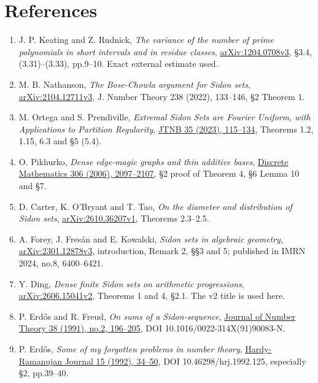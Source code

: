 \documentclass[11pt,a4paper]{article}
\providecommand{\tightlist}{\setlength{\itemsep}{0pt}\setlength{\parskip}{0pt}}
\begin{document}
\sloppy\section{References}\label{references}

\begin{enumerate}
\def\labelenumi{\arabic{enumi}.}
\tightlist
\item
  J. P. Keating and Z. Rudnick, \emph{The variance of the number of prime polynomials in short intervals and in residue classes}, \href{https://arxiv.org/pdf/1204.0708v3}{arXiv:1204.0708v3}, §3.4, (3.31)--(3.33), pp.9--10. Exact external estimate used.
\item
  M. B. Nathanson, \emph{The Bose-Chowla argument for Sidon sets}, \href{https://arxiv.org/pdf/2104.12711v3}{arXiv:2104.12711v3}, J. Number Theory 238 (2022), 133--146, §2 Theorem 1.
\item
  M. Ortega and S. Prendiville, \emph{Extremal Sidon Sets are Fourier Uniform, with Applications to Partition Regularity}, \href{https://www.numdam.org/item/10.5802/jtnb.1239.pdf}{JTNB 35 (2023), 115--134}, Theorems 1.2, 1.15, 6.3 and §5 (5.4).
\item
  O. Pikhurko, \emph{Dense edge-magic graphs and thin additive bases}, \href{https://opikhurko.warwick.ac.uk/E/Pikhurko06dm.pdf}{Discrete Mathematics 306 (2006), 2097--2107}, §2 proof of Theorem 4, §6 Lemma 10 and §7.
\item
  D. Carter, K. O'Bryant and T. Tao, \emph{On the diameter and distribution of Sidon sets}, \href{https://arxiv.org/pdf/2610.36207v1}{arXiv:2610.36207v1}, Theorems 2.3--2.5.
\item
  A. Forey, J. Fresán and E. Kowalski, \emph{Sidon sets in algebraic geometry}, \href{https://arxiv.org/pdf/2301.12878v3}{arXiv:2301.12878v3}, introduction, Remark 2, §§3 and 5; published in IMRN 2024, no.8, 6400--6421.
\item
  Y. Ding, \emph{Dense finite Sidon sets on arithmetic progressions}, \href{https://arxiv.org/pdf/2606.15041v2}{arXiv:2606.15041v2}, Theorems 1 and 4, §2.1. The v2 title is used here.
\item
  P. Erdős and R. Freud, \emph{On sums of a Sidon-sequence}, \href{https://www.sciencedirect.com/science/article/pii/0022314X9190083N}{Journal of Number Theory 38 (1991), no.2, 196--205}, DOI 10.1016/0022-314X(91)90083-N.
\item
  P. Erdős, \emph{Some of my forgotten problems in number theory}, \href{https://hrj.episciences.org/125/pdf}{Hardy-Ramanujan Journal 15 (1992), 34--50}, DOI 10.46298/hrj.1992.125, especially §2, pp.39--40.
\end{enumerate}
\end{document}
